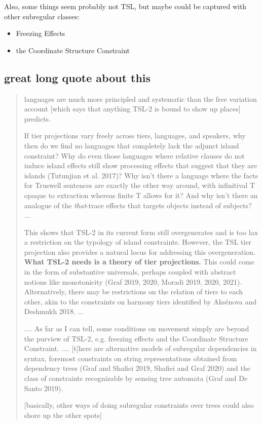Also, some things seem probably not TSL, but maybe could be captured with other subregular classes:

\begin{itemize}
  \item Freezing Effects
  \item the Coordinate Structure Constraint
\end{itemize}

\subsection*{great long quote about this}

\begin{quote}
languages are much more principled and systematic than the free variation account [which says that anything TSL-2 is bound to show up places] predicts.

If tier projections vary freely across tiers, languages, and speakers, why then do we find no languages that completely lack the adjunct island constraint? Why do even those languages where relative clauses do not induce island effects still show processing effects that suggest that they are islands (Tutunjian et al. 2017)? Why isn't there a language where the facts for Truswell sentences are exactly the other way around, with infinitival T opaque to extraction whereas finite T allows for it? And why isn't there an analogue of the \textit{that}-trace effects that targets objects instead of subjects? ...

This shows that TSL-2 in its current form still overgenerates and is too lax a restriction on the typology of island constraints. However, the TSL tier projection also provides a natural locus for addressing this overgeneration. \textbf{What TSL-2 needs is a theory of tier projections.} This could come in the form of substantive universals, perhaps coupled with abstract notions like monotonicity (Graf 2019, 2020, Moradi 2019, 2020, 2021). Alternatively, there may be restrictions on the relation of tiers to each other, akin to the constraints on harmony tiers identified by Aksënova and Deshmukh 2018. ...

.... As far as I can tell, some conditions on movement simply are beyond the purview of TSL-2, e.g. freezing effects and the Coordinate Structure Constraint. .... [t]here are alternative models of subregular dependencies in syntax, foremost constraints on string representations obtained from dependency trees (Graf and Shafiei 2019, Shafiei and Graf 2020) and the class of constraints recognizable by sensing tree automata (Graf and De Santo 2019).

[basically, other ways of doing subregular constraints over trees could also shore up the other spots]

\end{quote}
